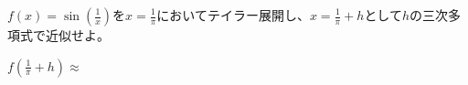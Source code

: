 \documentclass[times, 10pt,dvipdfmx]{jsarticle}
\newcommand{\ahd}{\vspace{10cm}}
\begin{document}
\begin{qlist}
\qitem $f(x) = \sin(\frac{1}{x})$を$x= \frac{1}{\pi}$においてテイラー展開し、$x = \frac{1}{\pi} + h$として$h$の三次多項式で近似せよ。
\vspace{5mm}

$f(\frac{1}{\pi} +h) \approx$ \underline{\hspace{10cm}}
\ahd
\end{qlist}


\clearpage

%
%
\clearpage
\end{document}
